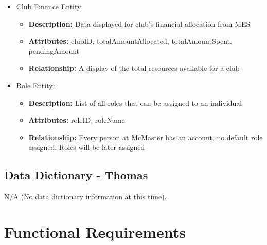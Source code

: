\documentclass[12pt]{article}
\begin{document}
\begin{itemize}
    \item Club Finance Entity:
      \begin{itemize}
          \item \textbf{Description:} Data displayed for club's financial allocation from MES
          \item \textbf{Attributes:} clubID, totalAmountAllocated, totalAmountSpent, pendingAmount
          \item \textbf{Relationship:} A display of the total resources available for a club 
        \end{itemize}

    \item Role Entity:
      \begin{itemize}
          \item \textbf{Description:} List of all roles that can be assigned to an individual
          \item \textbf{Attributes:} roleID, roleName
          \item \textbf{Relationship:} Every person at McMaster has an account, no default role assigned. Roles will be later assigned
        \end{itemize}
  \end{itemize}
  \subsection{Data Dictionary - Thomas}
  N/A (No data dictionary information at this time).

\section{Functional Requirements}
\end{document}
